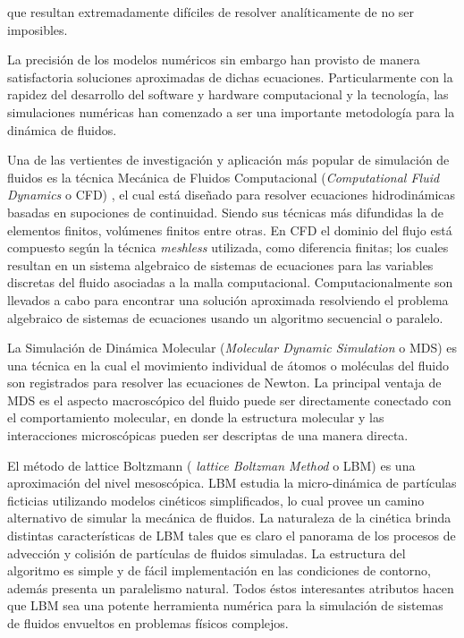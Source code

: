 que resultan extremadamente difíciles de resolver analíticamente de no ser imposibles.

 La precisión de los modelos numéricos sin embargo han provisto de manera satisfactoria soluciones aproximadas de dichas ecuaciones.
Particularmente con la rapidez del desarrollo del software y hardware computacional y la tecnología, las simulaciones numéricas han comenzado a ser una importante metodología para la dinámica de fluidos.

Una de las vertientes de  investigación y aplicación más popular de simulación de fluidos es la técnica Mecánica de Fluidos Computacional (\textit{Computational Fluid Dynamics} o CFD) , el cual está diseñado para resolver ecuaciones hidrodinámicas basadas en supociones de continuidad. Siendo sus técnicas más difundidas la de elementos finitos, volúmenes finitos entre otras.
En CFD el dominio del flujo está compuesto según la técnica \textit{meshless} utilizada, como  diferencia finitas; los cuales resultan en un sistema algebraico de sistemas de ecuaciones para las variables discretas del fluido asociadas a la malla computacional. 
Computacionalmente son llevados a cabo para encontrar una solución aproximada resolviendo el problema algebraico de sistemas de ecuaciones usando un algoritmo secuencial o paralelo.
 
La Simulación de Dinámica Molecular (\textit{Molecular Dynamic Simulation} o MDS) es una técnica en la cual el movimiento individual de átomos o moléculas del fluido son registrados para resolver las ecuaciones de Newton.
La principal ventaja de MDS es el aspecto macroscópico del fluido puede ser directamente conectado con el comportamiento molecular, en donde la estructura molecular y las interacciones microscópicas pueden ser descriptas de una manera directa.

El método de lattice Boltzmann ( \textit{lattice Boltzman Method} o LBM) es una aproximación del nivel mesoscópica. LBM estudia la micro-dinámica de partículas ficticias utilizando modelos cinéticos simplificados, lo cual provee un camino alternativo de simular la mecánica de fluidos. La naturaleza de la cinética brinda distintas características de LBM tales que es claro el panorama de los procesos de advección y colisión de partículas de fluidos simuladas. La estructura del algoritmo es simple y de fácil implementación en las condiciones de contorno, además presenta un paralelismo natural. Todos éstos interesantes atributos hacen que LBM sea una potente herramienta numérica para la simulación de sistemas de fluidos envueltos en problemas físicos complejos\cite{guo2013lattice}. 


